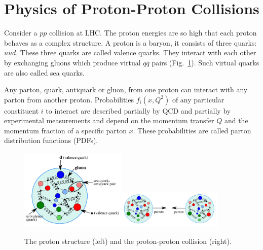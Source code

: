 \section{Physics of Proton-Proton Collisions}
\label{sec:Intro_ppCollisions}

Consider a $pp$ collision at LHC. The proton energies are so high that each proton behaves as a complex structure. A proton is a baryon, it consists of three quarks: $uud$. These three quarks are called valence quarks. They interact with each other by exchanging gluons which produce virtual $q\bar{q}$ pairs (Fig.~\ref{fig:ppCollision}). Such virtual quarks are also called sea quarks. 

Any parton, quark, antiquark or gluon, from one proton can interact with any parton from another proton. Probabilities $f_i(x,Q^2)$ of any particular constituent $i$ to interact are described partially by QCD and partially by experimental measurements and depend on the momentum transfer $Q$ and the momentum fraction of a specific parton $x$. These probabilities are called parton distribution functions (PDFs).

\begin{figure}[htb]
  \begin{center}
    {\includegraphics[width=0.45\textwidth]{../figs/Intro/protonStructure.png}\includegraphics[width=0.45\textwidth]{../figs/Intro/ppCollision.png}}
    \caption{The proton structure (left) and the proton-proton collision (right).}
    \label{fig:ppCollision}
  \end{center}
\end{figure}

